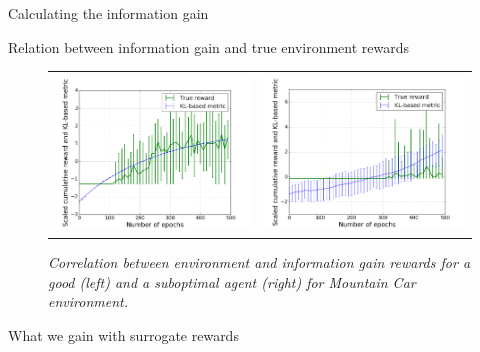\documentclass[final]{beamer}
\newlength{\onecolwid}
\begin{document}
\begin{frame}[t]
\begin{columns}[t]
\begin{column}{\onecolwid}
\begin{block}{Calculating the information gain}
\end{block}


\begin{block}{Relation between information gain and true environment rewards}

\begin{figure}[h!]
   \begin{tabular}{ll}
    	 \includegraphics[width=0.5\columnwidth]{misc/mountaincar_correlation.png} &
		 \includegraphics[width=0.5\columnwidth]{misc/mountaincar_correlation_badagent.png} \\
	 \end{tabular}
   \vspace{-0.4cm}\caption{\em Correlation between environment and information gain rewards for a good (left) and a suboptimal agent (right) for Mountain Car environment.}
\label{fig:correlation_check}
\end{figure}

\end{block}

\vspace*{-1.5cm}

\begin{block}{What we gain with surrogate rewards}

\vspace{-0.5\baselineskip}


\end{block}
\end{column}
\end{columns}
\end{frame}
\end{document}
